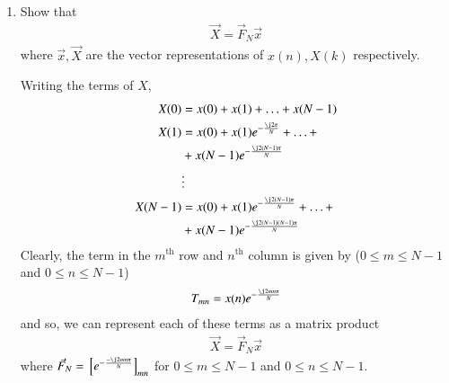 \documentclass[journal,12pt,twocolumn]{IEEEtran}
\renewcommand\thesection{\arabic{section}}
\begin{document}
\begin{enumerate}[label=\arabic*.,ref=\thesection.\theenumi]
 
	\item Show that 
	\begin{align}
		\vec{X} = \vec{F}_N \vec{x}
		\label{eq:dft-mat-def}
	\end{align}
	where $\vec{x}, \vec{X}$ are the vector representations of $x(n), X(k)$ respectively.
	
	\solution Writing the terms of $X$, 
	\begin{align}
		X(0) &= x(0) + x(1) + \ldots + x(N - 1) \\
		X(1) &= x(0) + x(1)e^{-\frac{\j2\pi}{N}} + \ldots + \nonumber \\
		&+ x(N - 1)e^{-\frac{\j2(N - 1)\pi}{N}} \\
		&\vdots \nonumber \\
		X(N - 1) &= x(0) + x(1)e^{-\frac{\j2(N - 1)\pi}{N}} + \ldots + \nonumber \\
		&+ x(N - 1)e^{-\frac{\j2(N - 1)(N - 1)\pi}{N}}	
	\end{align}
	Clearly, the term in the $m^{\text{th}}$ row and $n^{\text{th}}$ column is given by ($0 \leq m \leq N - 1$ and $0 \leq n \leq N - 1$) 
	\begin{align}
		T_{mn} = x(n)e^{-\frac{\j2mn\pi}{N}} 
	\end{align}
	and so, we can represent each of these terms as a matrix product
	\begin{align}
		\vec{X} = \vec{F}_N\vec{x}
	\end{align}
	where $\vec{F}_N = \sbrak{e^{-\frac{-\j2mn\pi}{N}}}_{mn}$ for $0 \leq m \leq N - 1$ and $0 \leq n \leq N - 1$. 
	
	
	

\end{enumerate}
\end{document}
